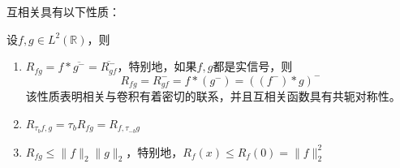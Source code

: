 互相关具有以下性质：
\begin{proposition}
    \label{prop:cross_correlation}
    设$f,g\in L^2(\mathbb{R})$，则
    \begin{enumerate}
        \item $R_{fg}=f* \overline{g^-}=\overline{R_{gf}^-}$，特别地，如果$f,g$都是实信号，则
              $$R_{fg} =R_{gf}^- =f *(g^-)=((f^-)*g)^-$$
              该性质表明相关与卷积有着密切的联系，并且互相关函数具有共轭对称性。
        \item $R_{\tau_b f,g}=\tau_{b}R_{fg}=R_{f,\tau_{-b}g}$
        \item $R_{fg}\leq\|f\|_2\|g\|_2$，特别地，$R_f(x)\leq R_f(0)=\|f\|_2^2$
    \end{enumerate}
\end{proposition}


